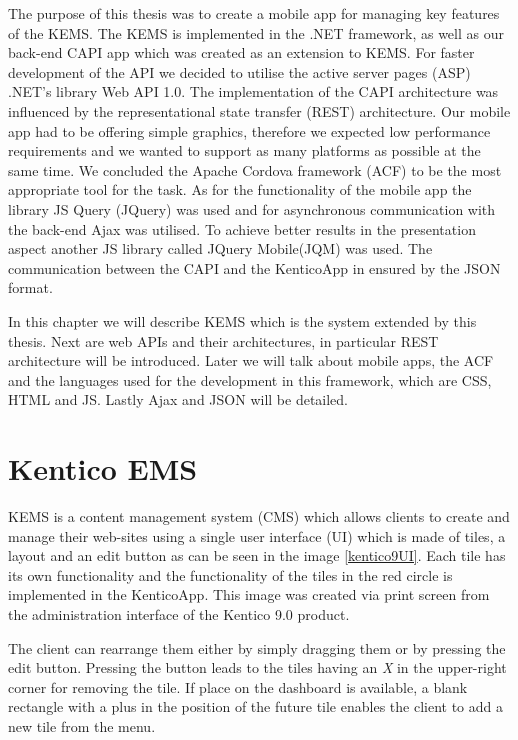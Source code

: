 The purpose of this thesis was to create a mobile app for managing key features of the KEMS. The KEMS is implemented in the .NET framework, as well as our back-end CAPI app which was created as an extension to KEMS. For faster development of the API we decided to utilise the active server pages (ASP) .NET's library Web API 1.0. The implementation of the CAPI architecture was influenced by the representational state transfer (REST) architecture. Our mobile app had to be offering simple graphics, therefore we expected low performance requirements and we wanted to support as many platforms as possible at the same time. We concluded the Apache Cordova framework (ACF) to be the most appropriate tool for the task. As for the functionality of the mobile app the library JS Query (JQuery) was used and for asynchronous communication with the back-end Ajax was utilised. To achieve better results in the presentation aspect another JS library called JQuery Mobile(JQM) was used. The communication between the CAPI and the KenticoApp in ensured by the JSON format.

In this chapter we will describe KEMS which is the system extended by this thesis. Next are web APIs and their architectures, in particular REST architecture will be introduced. Later we will talk about mobile apps, the ACF and the languages used for the development in this framework, which are CSS, HTML and JS. Lastly Ajax and JSON will be detailed. 
\section{Kentico EMS} \label{analysisKenticoCMS}
KEMS \cite{kentico-product-overview} is a content management system (CMS) which allows clients to create and manage their web-sites using a single user interface (UI) which is made of tiles, a layout and an edit button as can be seen in the image \ref{kentico9UI}. Each tile has its own functionality and the functionality of the tiles in the red circle is implemented in the KenticoApp. This image was created via print screen from the administration interface of the Kentico 9.0 product.

The client can rearrange them either by simply dragging them or by pressing the edit button. Pressing the button leads to the tiles having an \textit{X} in the upper-right corner for removing the tile. If place on the dashboard is available, a blank rectangle with a plus in the position of the future tile enables the client to add a new tile from the menu. 

